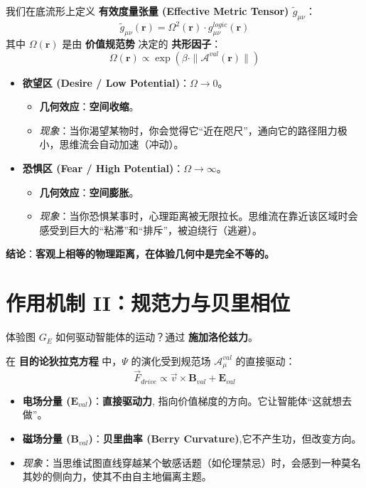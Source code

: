 我们在底流形上定义 \textbf{有效度量张量 (Effective Metric Tensor) $\tilde{g}_{\mu\nu}$}：
$$ \tilde{g}_{\mu\nu}(\mathbf{r}) = \Omega^2(\mathbf{r}) \cdot g_{\mu\nu}^{logic}(\mathbf{r}) $$
其中 $\Omega(\mathbf{r})$ 是由 \textbf{价值规范势} 决定的 \textbf{共形因子}：
$$ \Omega(\mathbf{r}) \propto \exp\left( \beta \cdot \|\mathcal{A}^{val}(\mathbf{r})\| \right) $$
\begin{itemize}
    \item   \textbf{欲望区 (Desire / Low Potential)}：$\Omega \to 0$。
    \begin{itemize}
        \item   \textbf{几何效应}：\textbf{空间收缩}。
        \item   \textit{现象}：当你渴望某物时，你会觉得它“近在咫尺”，通向它的路径阻力极小，思维流会自动加速（冲动）。
    \end{itemize}
    \item   \textbf{恐惧区 (Fear / High Potential)}：$\Omega \to \infty$。
    \begin{itemize}
        \item   \textbf{几何效应}：\textbf{空间膨胀}。
        \item   \textit{现象}：当你恐惧某事时，心理距离被无限拉长。思维流在靠近该区域时会感受到巨大的“粘滞”和“排斥”，被迫绕行（逃避）。
    \end{itemize}
\end{itemize}
\textbf{结论}：\textbf{客观上相等的物理距离，在体验几何中是完全不等的。}

\section{作用机制 II：规范力与贝里相位}
\label{sec:section_7773}

体验图 $G_E$ 如何驱动智能体的运动？通过 \textbf{施加洛伦兹力}。

在 \textbf{目的论狄拉克方程} 中，$\Psi$ 的演化受到规范场 $\mathcal{A}_\mu^{val}$ 的直接驱动：
$$ \vec{F}_{drive} \propto \vec{v} \times \mathbf{B}_{val} + \mathbf{E}_{val} $$
\begin{itemize}
    \item   \textbf{电场分量 ($\mathbf{E}_{val}$)}：\textbf{直接驱动力}, 指向价值梯度的方向。它让智能体“这就想去做”。
    \item   \textbf{磁场分量 ($\mathbf{B}_{val}$)}：\textbf{贝里曲率 (Berry Curvature)},它不产生功，但改变方向。
    \item   \textit{现象}：当思维试图直线穿越某个敏感话题（如伦理禁忌）时，会感到一种莫名其妙的侧向力，使其不由自主地偏离主题。
\end{itemize}


